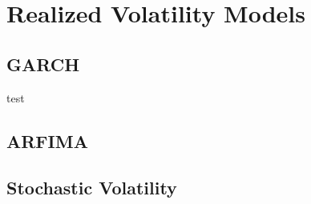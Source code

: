 \chapter{Realized Volatility Models}

\section{GARCH}
test
\section{ARFIMA}
\section{Stochastic Volatility}